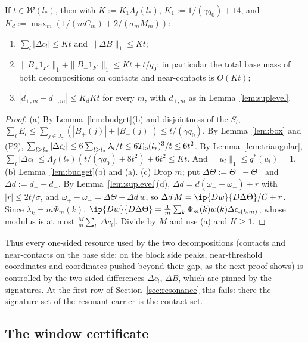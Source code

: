 \begin{proposition}\label{prop:pinned}
If $t\in\mathcal W(l_*)$, then with $K:=K_1\Lambda_f(l_*)$,
$K_1:=1/(\gamma q_0)+14$, and $K_d:=\max_m(1/(mC_m)+2/(\sigma_mM_m))$:
\begin{enumerate}
\item[(a)] $\sum_l|\Delta c_l|\le Kt$ and $\|\Delta B\|_1\le Kt$;
\item[(b)] $\|B_+1_{F^c}\|_1+\|B_-1_{F^c}\|_1\le Kt+t/q_0$; in particular the
total base mass of both decompositions on contacts and near-contacts is
$O(Kt)$;
\item[(c)] $|d_{+,m}-d_{-,m}|\le K_dKt$ for every $m$, with $d_{\pm,m}$ as in
Lemma~\ref{lem:suplevel}.
\end{enumerate}
\end{proposition}

\begin{proof}
(a) By Lemma~\ref{lem:budget}(b) and disjointness of the $S_l$,
$\sum_lE_l\le\sum_{j\in J_\gamma}(|B_+(j)|+|B_-(j)|)\le t/(\gamma q_0)$.  By
Lemma~\ref{lem:box} and (P2), $\sum_{l>l_*}|\Delta c_l|\le6\sum_{l>l_*}
\lambda_l/t\le6T_{\rm lo}(l_*)^3/t\le6t^2$.  By Lemma~\ref{lem:triangular},
$\sum_l|\Delta c_l|\le\Lambda_f(l_*)(t/(\gamma q_0)+8t^2)+6t^2\le Kt$.  And
$\|u_l\|_1\le q^*(u_l)=1$.  (b) Lemma~\ref{lem:budget}(b) and (a).
(c) Drop $m$; put $\Delta\Theta:=\Theta_+-\Theta_-$ and $\Delta d:=d_+-d_-$.
By Lemma~\ref{lem:suplevel}(d), $\Delta d=d(\omega_+-\omega_-)+r$ with
$|r|\le2t/\sigma$, and $\omega_+-\omega_-=\Delta\Theta+\Delta d\,w$, so
$\Delta d\,M=\ip{Dw}{D\Delta\Theta}/C+r$.  Since $\lambda_k=m\Phi_m(k)$,
$\ip{Dw}{D\Delta\Theta}=\frac1m\sum_k\Phi_m(k)w(k)\Delta c_{\iota(k,m)}$,
whose modulus is at most $\frac Mm\sum_l|\Delta c_l|$.  Divide by $M$ and
use (a) and $K\ge1$.
\end{proof}

Thus every one-sided resource used by the two decompositions (contacts and
near-contacts on the base side; on the block side peaks, near-threshold
coordinates and coordinates pushed beyond their gap, as the next proof
shows) is controlled by the two-sided differences $\Delta c_l$, $\Delta B$,
which are pinned by the signatures.  At the first row of
Section~\ref{sec:resonance} this fails: there the signature set of the
resonant carrier is the contact set.

\subsection{The window certificate}


